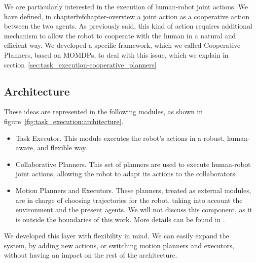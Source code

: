 We are particularly interested in the execution of human-robot joint actions. We have defined, in chapter\~ref{chapter-overview} a joint action as a cooperative action between the two agents. As previously said, this kind of action requires additional mechanism to allow the robot to cooperate with the human in a natural and efficient way. We developed a specific framework, which we called Cooperative Planners, based on MOMDPs, to deal with this issue, which we explain in section~\ref{sec:task_execution-cooperative_planners}

\subsection{Architecture}

These ideas are represented in the following modules, as shown in figure~\ref{fig:task_execution:architecture}.
\begin{itemize}
	\item Task Executor. This module executes the robot's actions in a robust, human-aware, and flexible way.
	\item Collaborative Planners. This set of planners are used to execute human-robot joint actions, allowing the robot to adapt its actions to the collaborators.
	\item Motion Planners and Executors. These planners, treated as external modules, are in charge of choosing trajectories for the robot, taking into account the environment and the present agents. We will not discuss this component, as it is outside the boundaries of this work. More details can be found in \cite{Sisbot2008,Mainprice2011,Pandey2010}.
\end{itemize}

We developed this layer with flexibility in mind. We can easily expand the system, by adding new actions, or switching motion planners and executors, without having an impact on the rest of the architecture.

